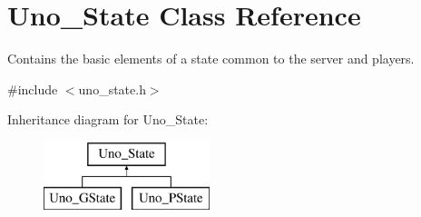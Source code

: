 \hypertarget{class_uno___state}{
\section{\-Uno\-\_\-\-State \-Class \-Reference}
\label{class_uno___state}
}


\-Contains the basic elements of a state common to the server and players.  




{\ttfamily \#include $<$uno\-\_\-state.\-h$>$}

\-Inheritance diagram for \-Uno\-\_\-\-State\-:\begin{figure}[H]
\begin{center}
\leavevmode
\includegraphics[height=2.000000cm]{class_uno___state}
\end{center}
\end{figure}
